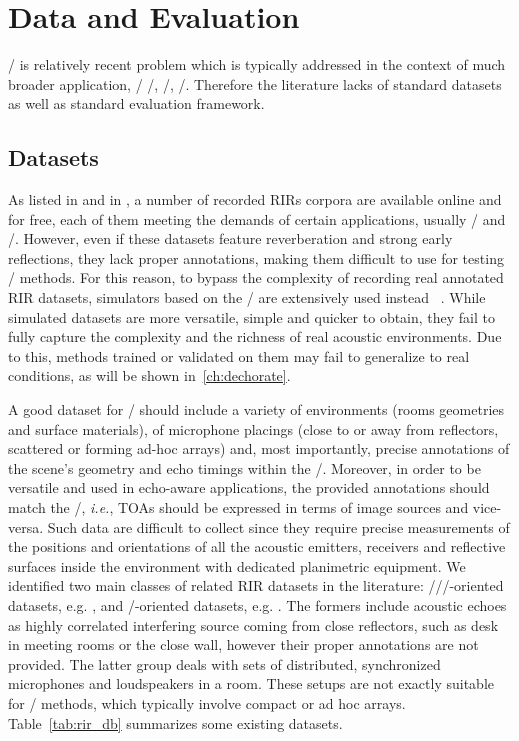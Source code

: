 \section{Data and Evaluation}
\AER/ is relatively recent problem which is typically addressed in the context of much broader application, \eg/ \SE/, \RooGE/, \SSL/.
Therefore the literature lacks of standard datasets as well as standard evaluation framework.

\subsection{Datasets}
As listed in  and in , a number of recorded RIRs corpora are available online and for free, each of them meeting the demands of certain applications, usually \SE/ and \ASR/.
However, even if these datasets feature reverberation and strong early reflections, they lack proper annotations, making them difficult to use for testing \AER/ methods.
For this reason, to bypass the complexity of recording real annotated RIR datasets, simulators based on the \ISM/ are extensively used instead%
~\citeonly{}.
While simulated datasets are more versatile, simple and quicker to obtain, they fail to fully capture the complexity and the richness of real acoustic environments.
Due to this, methods trained or validated on them may fail to generalize to real conditions, as will be shown in~\cref{ch:dechorate}.

\mynewline
A good dataset for \AER/ should include a variety of environments (rooms geometries and surface materials), of microphone placings (close to or away from reflectors, scattered or forming ad-hoc arrays) and, most importantly, precise annotations of the scene's geometry and echo timings within the \RIRs/.
Moreover, in order to be versatile and used in echo-aware applications, the provided annotations should match the \ISM/, \textit{i.e.}, TOAs should be expressed in terms of image sources and vice-versa.
Such data are difficult to collect since they require precise measurements of the positions and orientations of all the acoustic emitters, receivers and reflective surfaces inside the environment with dedicated planimetric equipment.
We identified two main classes of related RIR datasets in the literature:
\SE//\ASR/-oriented datasets, e.g. , and \RooGE/-oriented datasets, e.g. .
The formers include acoustic echoes as highly correlated interfering source coming from close reflectors, such as desk in meeting rooms or the close wall, however their proper annotations are not provided.
The latter group deals with sets of distributed, synchronized microphones and loudspeakers in a room.
These setups are not exactly suitable for \SE/ methods, which typically involve compact or ad hoc arrays. Table~\ref{tab:rir_db} summarizes some existing datasets.


